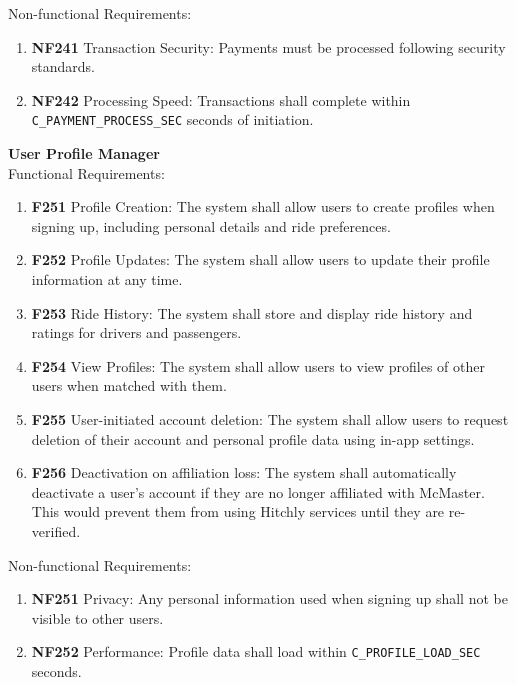 \documentclass[12pt,letterpaper]{article}
\begin{document}
Non-functional Requirements:
\begin{enumerate}
  \item \textbf{NF241} Transaction Security: Payments must be processed following security standards.
  \item \textbf{NF242} Processing Speed: Transactions shall complete within \texttt{C\_PAYMENT\_PROCESS\_SEC} seconds of initiation.
\end{enumerate}
\vspace{1em}
\noindent \textbf{User Profile Manager} \\
Functional Requirements:
\begin{enumerate}
  \item \textbf{F251} Profile Creation: The system shall allow users to create profiles when signing up, including personal details and ride preferences.
  \item \textbf{F252} Profile Updates: The system shall allow users to update their profile information at any time.
  \item \textbf{F253} Ride History: The system shall store and display ride history and ratings for drivers and passengers.
  \item \textbf{F254} View Profiles: The system shall allow users to view profiles of other users when matched with them.
  \item \textbf{F255} User-initiated account deletion: The system shall allow users to request deletion of their account and personal profile data using in-app settings.
  \item \textbf{F256} Deactivation on affiliation loss: The system shall automatically deactivate a user's account if they are no longer affiliated with McMaster. This would prevent them from using Hitchly services until they are re-verified.
\end{enumerate}
Non-functional Requirements:
\begin{enumerate}
  \item \textbf{NF251} Privacy: Any personal information used when signing up shall not be visible to other users.
  \item \textbf{NF252} Performance: Profile data shall load within \texttt{C\_PROFILE\_LOAD\_SEC} seconds.
\end{enumerate}
\end{document}
